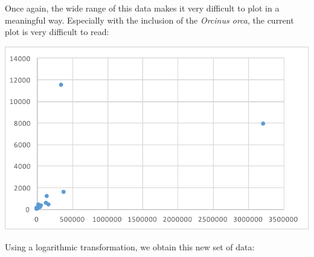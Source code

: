 \documentclass[10pt,letterpaper]{article}
\begin{document}
			Once again, the wide range of this data makes it very difficult to plot in a meaningful way. Especially with the inclusion of the \emph{Orcinus orca}, the current plot is very difficult to read:
			\newline \newline
			\centerline{\includegraphics{Picture7.pdf}}
			\newline \newline 
			Using a logarithmic transformation, we obtain this new set of data:
\end{document}
